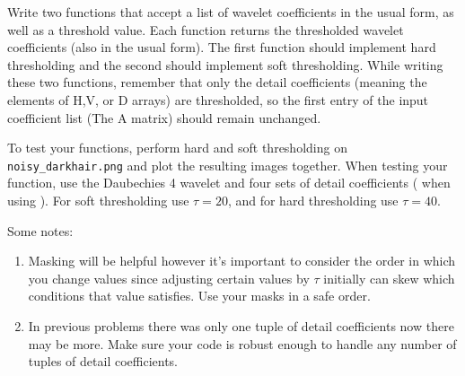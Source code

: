 
\begin{problem}
Write two functions that accept a list of wavelet coefficients in the usual form, as well as a threshold value. Each function returns the thresholded wavelet coefficients (also in the usual form). The first function should implement hard thresholding and the second should implement soft thresholding.
While writing these two functions, remember that only the detail coefficients (meaning the elements of H,V, or D arrays) are thresholded, so the first entry of the input coefficient list (The A matrix) should remain unchanged. 

To test your functions, perform hard and soft thresholding on \texttt{noisy\_darkhair.png} and plot the resulting images together.
When testing your function, use the Daubechies 4 wavelet and four sets of detail coefficients ( when using ).
For soft thresholding use $\tau=20$, and for hard thresholding use $\tau=40$.

\noindent Some notes:
\begin{enumerate}
\item Masking will be helpful however it's important to consider the order in which you change values since adjusting certain values by $\tau$ initially can skew which conditions that value satisfies. Use your masks in a safe order.
\item In previous problems there was only one tuple of detail coefficients now there may be more. Make sure your code is robust enough to handle any number of tuples of detail coefficients.
\end{enumerate}
 
\end{problem}

\begin{comment}
\begin{problem}
Create a noisy version of the Lena image by adding Gaussian
white noise of mean 0 and standard deviation $\sigma = 20$ (i.e. \li{scale=20}).
Compute four levels of the wavelet coefficients using the Daubechies 4 Wavelet,
and input these into your
thresholding functions (with $\tau = 3\sigma$ for the hard threshold,
and $\tau = 3\sigma/2$ for the soft threshold). Reconstruct the
two denoised images, and then plot these together alongside the
noisy image. Your output should match Figure \ref{fig:denoise}.

What do you notice? How does lowering or raising the
threshold affect the reconstructed images? What happens if you use
a different Wavelet?
\end{problem}
\end{comment}


